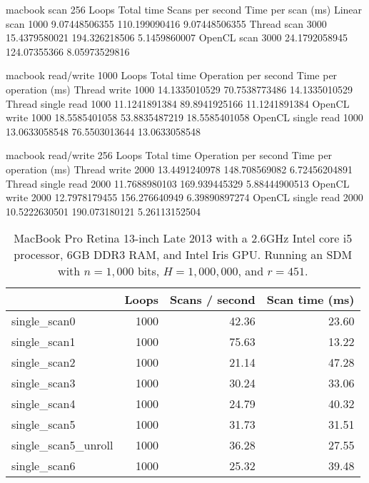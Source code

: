 macbook scan 256
	Loops	Total time	Scans per second	Time per scan (ms)
Linear scan	1000	9.07448506355	110.199090416	9.07448506355
Thread scan	3000	15.4379580021	194.326218506	5.1459860007
OpenCL scan	3000	24.1792058945	124.07355366	8.05973529816

macbook read/write 1000
	Loops	Total time	Operation per second	Time per operation (ms)
Thread write	1000	14.1335010529	70.7538773486	14.1335010529
Thread single read	1000	11.1241891384	89.8941925166	11.1241891384
OpenCL write	1000	18.5585401058	53.8835487219	18.5585401058
OpenCL single read	1000	13.0633058548	76.5503013644	13.0633058548

macbook read/write 256
	Loops	Total time	Operation per second	Time per operation (ms)
Thread write	2000	13.4491240978	148.708569082	6.72456204891
Thread single read	2000	11.7688980103	169.939445329	5.88444900513
OpenCL write	2000	12.7978179455	156.276640949	6.39890897274
OpenCL single read	2000	10.5222630501	190.073180121	5.26113152504


\begin{table}[!htb]
\centering
\begin{tabular}{| l | r | r | r |}
    \hline
    & Loops & Scans / second & Scan time (ms) \\ \hline
    single\_scan0 & 1000 & 42.36 & 23.60 \\
    single\_scan1 & 1000 & 75.63 & 13.22 \\
    single\_scan2 & 1000 & 21.14 & 47.28 \\
    single\_scan3 & 1000 & 30.24 & 33.06 \\
    single\_scan4 & 1000 & 24.79 & 40.32 \\
    single\_scan5 & 1000 & 31.73 & 31.51 \\
    single\_scan5\_unroll & 1000 & 36.28 & 27.55 \\
    single\_scan6 & 1000 & 25.32 & 39.48 \\
    \hline
\end{tabular}
\caption{MacBook Pro Retina 13-inch Late 2013 with a 2.6GHz Intel core i5 processor, 6GB DDR3 RAM, and Intel Iris GPU. Running an SDM with $n=1,000$ bits, $H=1,000,000$, and $r=451$.
\label{tab:perf-macbook-kernels-1000}}
\end{table}



